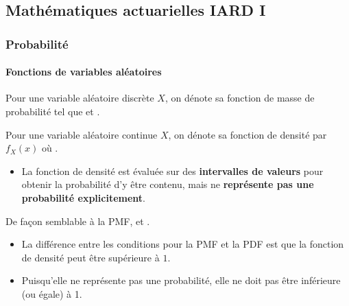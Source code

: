 \documentclass[10pt, french]{article}
\begin{document}
\begin{multicols*}{2}

\pagebreak

\part{Mathématiques actuarielles IARD I}
\label{chapt:mathIARD}
\section{Probabilité}
\subsection{Fonctions de variables aléatoires}
\label{subsec:rvfunct}
\begin{definitionNOHFILL}
Pour une variable aléatoire discrète $X$, on dénote sa fonction de masse de probabilité  tel que  et .
\end{definitionNOHFILL}

\begin{definitionNOHFILL}
Pour une variable aléatoire continue $X$, on dénote sa fonction de densité par $f_{X}(x)$ où . 
\begin{itemize}
	\item	La fonction de densité est évaluée sur des \textbf{intervalles de valeurs} pour obtenir la probabilité d'y être contenu, mais ne \textbf{représente pas une probabilité explicitement}.
\end{itemize}

De façon semblable à la PMF,  et .
\begin{itemize}
	\item	La différence entre les conditions pour la PMF et la PDF est que la fonction de densité peut être supérieure à $1$.
	\item	Puisqu'elle ne représente pas une probabilité, elle ne doit pas être inférieure (ou égale) à 1.
\end{itemize}
\end{definitionNOHFILL}



\end{multicols*}
\end{document}
